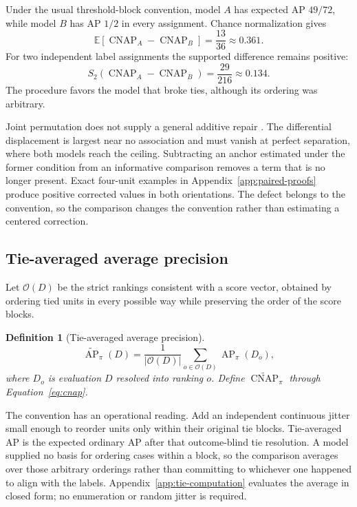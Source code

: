 \documentclass[11pt]{article}
\newcommand{\AP}{\operatorname{AP}}
\newcommand{\CNAP}{\operatorname{CNAP}}
\newcommand{\E}{\mathbb{E}}
\newcommand{\APta}{\widetilde{\AP}}
\newcommand{\CNAPta}{\widetilde{\CNAP}}
\newtheorem{definition}{Definition}
\theoremstyle{remark}
\begin{document}
Under the usual threshold-block convention, model $A$ has expected AP $49/72$, while model $B$ has AP $1/2$ in every assignment. Chance normalization gives
\[
\E[\CNAP_A-\CNAP_B]
=
\frac{13}{36}
\approx0.361.
\]
For two independent label assignments the supported difference remains positive:
\[
S_2(\CNAP_A-\CNAP_B)
=
\frac{29}{216}
\approx0.134.
\]
The procedure favors the model that broke ties, although its ordering was arbitrary.

Joint permutation does not supply a general additive repair \cite{ojala2010permutation}. The differential displacement is largest near no association and must vanish at perfect separation, where both models reach the ceiling. Subtracting an anchor estimated under the former condition from an informative comparison removes a term that is no longer present. Exact four-unit examples in Appendix~\ref{app:paired-proofs} produce positive corrected values in both orientations. The defect belongs to the convention, so the comparison changes the convention rather than estimating a centered correction.

\subsection{Tie-averaged average precision}
\label{sec:tie-average}

Let $\mathcal O(D)$ be the strict rankings consistent with a score vector, obtained by ordering tied units in every possible way while preserving the order of the score blocks.

\begin{definition}[Tie-averaged average precision]
\begin{equation}
\APta_\pi(D)
=
\frac{1}{|\mathcal O(D)|}
\sum_{o\in\mathcal O(D)}
\AP_\pi(D_o),
\label{eq:tie-average}
\end{equation}
where $D_o$ is evaluation $D$ resolved into ranking $o$. Define $\CNAPta_\pi$ through Equation~\eqref{eq:cnap}.
\end{definition}

The convention has an operational reading. Add an independent continuous jitter small enough to reorder units only within their original tie blocks. Tie-averaged AP is the expected ordinary AP after that outcome-blind tie resolution. A model supplied no basis for ordering cases within a block, so the comparison averages over those arbitrary orderings rather than committing to whichever one happened to align with the labels. Appendix~\ref{app:tie-computation} evaluates the average in closed form; no enumeration or random jitter is required.
\end{document}

